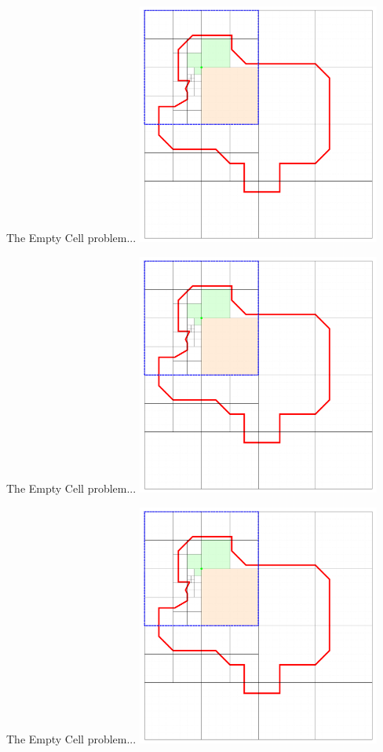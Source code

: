 \documentclass{beamer}
\begin{document}
\begin{frame}{The Empty Cell problem...}
    \centering
	\includegraphics[page=1,width=0.6\textwidth]{figures/05-EmptyCells/Example}
\end{frame}
\begin{frame}{The Empty Cell problem...}
    \centering
	\includegraphics[page=2,width=0.6\textwidth]{figures/05-EmptyCells/Example}
\end{frame}
\begin{frame}{The Empty Cell problem...}
    \centering
	\includegraphics[page=3,width=0.6\textwidth]{figures/05-EmptyCells/Example}
\end{frame}
\end{document}
